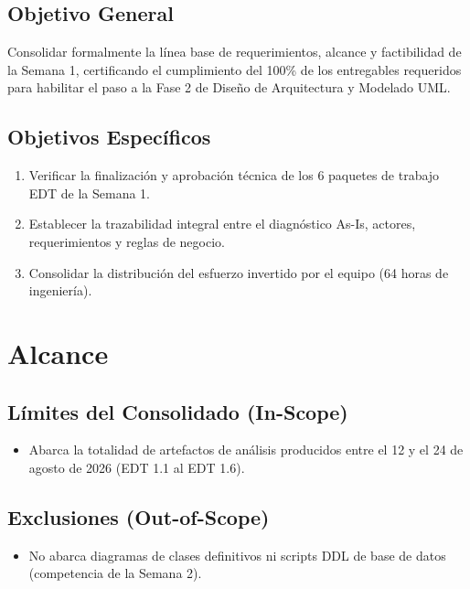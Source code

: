 \documentclass[12pt,a4paper]{article}
\begin{document}
\subsection{Objetivo General}
Consolidar formalmente la línea base de requerimientos, alcance y factibilidad de la Semana 1, certificando el cumplimiento del 100\% de los entregables requeridos para habilitar el paso a la Fase 2 de Diseño de Arquitectura y Modelado UML.

\subsection{Objetivos Específicos}
\begin{enumerate}[leftmargin=1.5em, itemsep=2pt, topsep=2pt]
    \item Verificar la finalización y aprobación técnica de los 6 paquetes de trabajo EDT de la Semana 1.
    \item Establecer la trazabilidad integral entre el diagnóstico As-Is, actores, requerimientos y reglas de negocio.
    \item Consolidar la distribución del esfuerzo invertido por el equipo (64 horas de ingeniería).
\end{enumerate}

\section{Alcance}

\subsection{Límites del Consolidado (In-Scope)}
\begin{itemize}[leftmargin=1.5em, itemsep=2pt]
    \item Abarca la totalidad de artefactos de análisis producidos entre el 12 y el 24 de agosto de 2026 (EDT 1.1 al EDT 1.6).
\end{itemize}

\subsection{Exclusiones (Out-of-Scope)}
\begin{itemize}[leftmargin=1.5em, itemsep=2pt]
    \item No abarca diagramas de clases definitivos ni scripts DDL de base de datos (competencia de la Semana 2).
\end{itemize}
\end{document}
